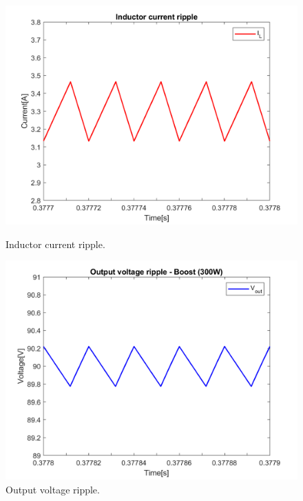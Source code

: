 \begin{figure}[H]
	\begin{minipage}[c]{0.5\textwidth}
		\centering
		\includegraphics[width=1\textwidth]{../Pictures/P1/Open_loop_simulation/open_loop_IL_ripple} %
		\caption{Inductor current ripple.}
		\label{fig:inductor_ripple}
	\end{minipage}
	\hfill
	\begin{minipage}[c]{0.5\textwidth}
		\centering
		\includegraphics[width=1\textwidth]{../Pictures/P1/Open_loop_simulation/open_loop_Vout_ripple} %
		\caption{Output voltage ripple.}
		\label{fig:output_voltage_ripple}
	\end{minipage}  
\end{figure}



